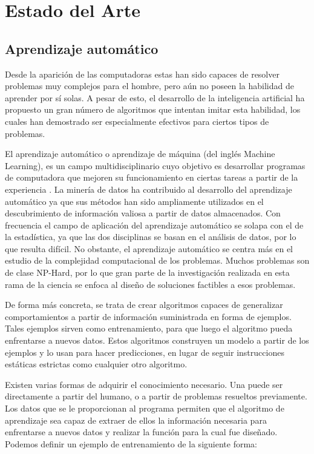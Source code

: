 \section{Estado del Arte}


\subsection{Aprendizaje automático}
Desde la aparición de las computadoras estas han sido capaces de resolver problemas muy complejos para el hombre, pero aún no poseen la habilidad de aprender por sí solas. A pesar de esto, el desarrollo de la inteligencia artificial ha propuesto un gran número de algoritmos que intentan imitar esta habilidad, los cuales han demostrado ser especialmente efectivos para ciertos tipos de problemas.

El aprendizaje automático o aprendizaje de máquina (del inglés Machine Learning), es un campo multidisciplinario cuyo objetivo es desarrollar programas de computadora que mejoren su funcionamiento en ciertas tareas a partir de la experiencia \cite{Mitchell1997}.
La minería de datos ha contribuido al desarrollo del aprendizaje automático ya que sus métodos han sido ampliamente utilizados en el descubrimiento de información valiosa a partir de datos almacenados\cite{Witten2002}. Con frecuencia el campo de aplicación del aprendizaje automático se solapa con el de la estadística, ya que las dos disciplinas se basan en el análisis de datos, por lo que resulta difícil. No obstante, el aprendizaje automático se centra más en el estudio de la complejidad computacional de los problemas. Muchos problemas son de clase NP-Hard, por lo que gran parte de la investigación realizada en esta rama de la ciencia se enfoca al diseño de soluciones factibles a esos problemas.

De forma más concreta, se trata de crear algoritmos capaces de generalizar comportamientos a partir de información suministrada en forma de ejemplos. Tales ejemplos sirven como entrenamiento, para que luego el algoritmo pueda enfrentarse a nuevos datos. Estos algoritmos construyen un modelo a partir de los ejemplos y lo usan para hacer predicciones, en lugar de seguir instrucciones estáticas estrictas como cualquier otro algoritmo.

Existen varias formas de adquirir el conocimiento necesario. Una puede ser directamente a partir del humano, o a partir de problemas resueltos previamente. Los datos que se le proporcionan al programa permiten que el algoritmo de aprendizaje sea capaz de extraer de ellos la información necesaria para enfrentarse a nuevos datos y realizar la función para la cual fue diseñado. Podemos definir un ejemplo de entrenamiento de la siguiente forma:

